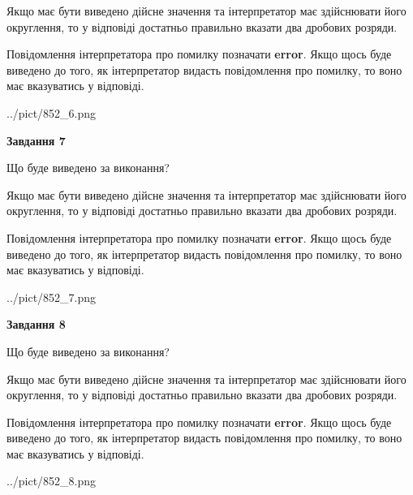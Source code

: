 \documentclass[12pt, ukrainian]{article}
\begin{document}
{\begin {Large}
Якщо має бути виведено дійсне значення та інтерпретатор має здійснювати його округлення, 
то у відповіді достатньо правильно вказати два дробових розряди.

Повідомлення інтерпретатора про помилку позначати \textbf{error}.
Якщо щось буде виведено до того, як інтерпретатор видасть повідомлення про помилку, 
то воно має вказуватись у відповіді. \par

\begin{center}
	{../pict/852_6.png}
\end{center}
\newpage

{\begin {center}\textbf{Завдання 7}\end {center}}\par
Що буде виведено за виконання? \par

Якщо має бути виведено дійсне значення та інтерпретатор має здійснювати його округлення, 
то у відповіді достатньо правильно вказати два дробових розряди.

Повідомлення інтерпретатора про помилку позначати \textbf{error}.
Якщо щось буде виведено до того, як інтерпретатор видасть повідомлення про помилку, 
то воно має вказуватись у відповіді. \par

\begin{center}
	{../pict/852_7.png}
\end{center}
\newpage

{\begin {center}\textbf{Завдання 8}\end {center}}\par
Що буде виведено за виконання? \par

Якщо має бути виведено дійсне значення та інтерпретатор має здійснювати його округлення, 
то у відповіді достатньо правильно вказати два дробових розряди.

Повідомлення інтерпретатора про помилку позначати \textbf{error}.
Якщо щось буде виведено до того, як інтерпретатор видасть повідомлення про помилку, 
то воно має вказуватись у відповіді. \par

\begin{center}
	{../pict/852_8.png}
\end{center}
\newpage


\end{Large}}
\end{document}
